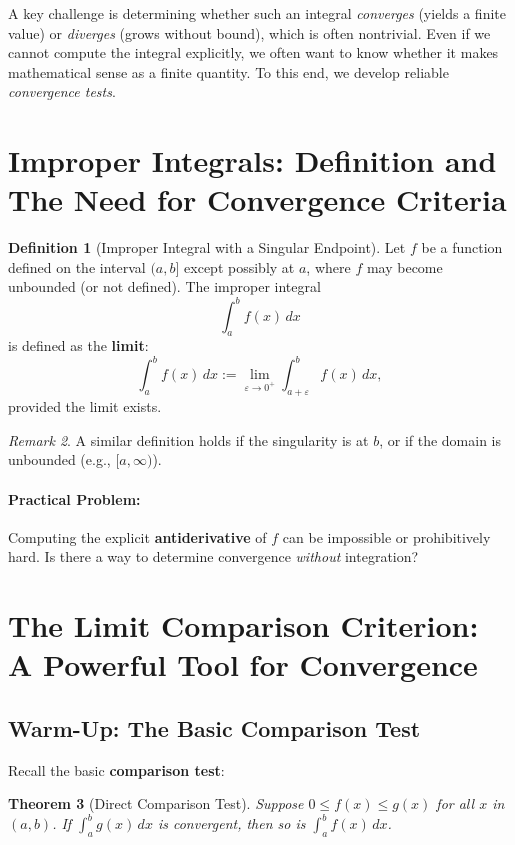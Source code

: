 \documentclass[12pt]{article}
\theoremstyle{definition}
\newtheorem{definition}{Definition}[section]
\theoremstyle{plain}
\newtheorem{theorem}[definition]{Theorem}
\theoremstyle{remark}
\newtheorem{remark}[definition]{Remark}
\begin{document}
A key challenge is determining whether such an integral \emph{converges} (yields a finite value) or \emph{diverges} (grows without bound), which is often nontrivial. Even if we cannot compute the integral explicitly, we often want to know whether it makes mathematical sense as a finite quantity. To this end, we develop reliable \emph{convergence tests}.

\section{Improper Integrals: Definition and The Need for Convergence Criteria}

\begin{definition}[Improper Integral with a Singular Endpoint]
Let $f$ be a function defined on the interval $(a, b]$ except possibly at $a$, where $f$ may become unbounded (or not defined). The improper integral
\[
\int_{a}^{b} f(x) \, dx
\]
is defined as the \textbf{limit}:
\[
\int_{a}^{b} f(x) \, dx := \lim_{\varepsilon \to 0^+} \int_{a+\varepsilon}^{b} f(x) \, dx,
\]
provided the limit exists.
\end{definition}

\begin{remark}
A similar definition holds if the singularity is at $b$, or if the domain is unbounded (e.g., $[a, \infty)$).
\end{remark}

\paragraph{Practical Problem:} Computing the explicit \textbf{antiderivative} of $f$ can be impossible or prohibitively hard. Is there a way to determine convergence \emph{without} integration?

\section{The Limit Comparison Criterion: A Powerful Tool for Convergence}

\subsection{Warm-Up: The Basic Comparison Test}

Recall the basic \textbf{comparison test}:

\begin{theorem}[Direct Comparison Test]
Suppose $0 \leq f(x) \leq g(x)$ for all $x$ in $(a, b)$. If $\int_{a}^{b} g(x)\, dx$ is convergent, then so is $\int_{a}^{b} f(x)\, dx$.
\end{theorem}
\end{document}
